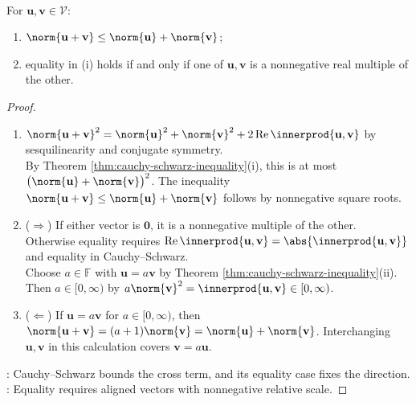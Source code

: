 \begin{theorem} \label{thm:triangle-inequality-inner-product} \\
For $\mathbf{u},\mathbf{v}\in\mathcal{V}$:
\begin{enumerate}[label=(\roman*)]
\setlength{\itemsep}{0pt}
\item $\norm{\mathbf{u}+\mathbf{v}}\leq\norm{\mathbf{u}}+\norm{\mathbf{v}}$;
\item equality in (i) holds if and only if one of $\mathbf{u},\mathbf{v}$ is a nonnegative real multiple of the other.
\end{enumerate}
\begin{proof}
\begin{enumerate}[label=(\roman*)]
\setlength{\itemsep}{0pt}
\item[$(i)$] $\norm{\mathbf{u}+\mathbf{v}}^2=\norm{\mathbf{u}}^2+\norm{\mathbf{v}}^2+2\operatorname{Re}\innerprod{\mathbf{u},\mathbf{v}}$ by sesquilinearity and conjugate symmetry.\\
By Theorem \ref{thm:cauchy-schwarz-inequality}(i), this is at most $\bigl(\norm{\mathbf{u}}+\norm{\mathbf{v}}\bigr)^2$. The inequality $\norm{\mathbf{u}+\mathbf{v}}\leq\norm{\mathbf{u}}+\norm{\mathbf{v}}$ follows by nonnegative square roots.
\item[$(ii)$] ($\Rightarrow$) If either vector is $\mathbf{0}$, it is a nonnegative multiple of the other.\\
Otherwise equality requires $\operatorname{Re}\innerprod{\mathbf{u},\mathbf{v}}=\abs{\innerprod{\mathbf{u},\mathbf{v}}}$ and equality in Cauchy--Schwarz.\\
Choose $a\in\mathbb{F}$ with $\mathbf{u}=a\mathbf{v}$ by Theorem \ref{thm:cauchy-schwarz-inequality}(ii). Then $a\in[0,\infty)$ by $a\norm{\mathbf{v}}^2=\innerprod{\mathbf{u},\mathbf{v}}\in[0,\infty)$.
\item[$(ii)$] ($\Leftarrow$) If $\mathbf{u}=a\mathbf{v}$ for $a\in[0,\infty)$, then $\norm{\mathbf{u}+\mathbf{v}}=(a+1)\norm{\mathbf{v}}=\norm{\mathbf{u}}+\norm{\mathbf{v}}$. Interchanging $\mathbf{u},\mathbf{v}$ in this calculation covers $\mathbf{v}=a\mathbf{u}$.
\end{enumerate}
: Cauchy--Schwarz bounds the cross term, and its equality case fixes the direction.\\
: Equality requires aligned vectors with nonnegative relative scale.
\end{proof}
\end{theorem}

